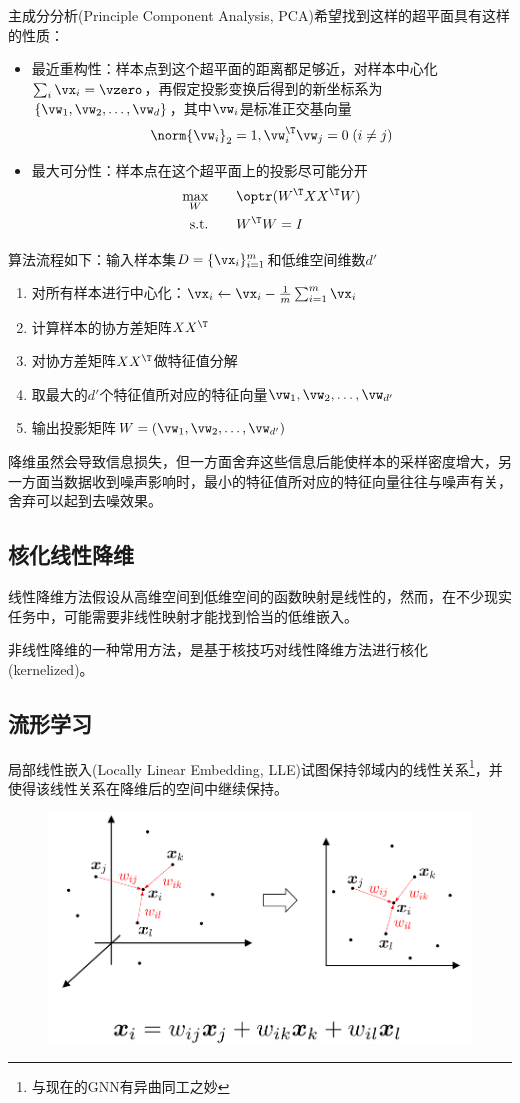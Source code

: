 主成分分析(Principle Component Analysis, PCA)希望找到这样的超平面具有这样的性质：
\begin{itemize}
	\item 最近重构性：样本点到这个超平面的距离都足够近，对样本中心化$\sum_i\vx_i=\vzero$，再假定投影变换后得到的新坐标系为$\{\vw_1,\vw_2,\ldots,\vw_d\}$，其中$\vw_i$是标准正交基向量
	\[\norm{\vw_i}_2=1,\vw_i^\T\vw_j=0\;(i\ne j)\]
	\item 最大可分性：样本点在这个超平面上的投影尽可能分开
	\[\begin{aligned}
	\max_{W} &\qquad \optr(W^\T XX^\T W)\\
	\text{s.t.} &\qquad W^\T W=I
	\end{aligned}\]
\end{itemize}

算法流程如下：输入样本集$D=\{\vx_i\}_{i=1}^m$和低维空间维数$d'$
\begin{enumerate}
	\item 对所有样本进行中心化：$\vx_i\gets \vx_i-\frac{1}{m}\sum_{i=1}^m\vx_i$
	\item 计算样本的协方差矩阵$XX^\T$
	\item 对协方差矩阵$XX^\T$做特征值分解
	\item 取最大的$d'$个特征值所对应的特征向量$\vw_1,\vw_2,\ldots,\vw_{d'}$
	\item 输出投影矩阵$W=(\vw_1,\vw_2,\ldots,\vw_{d'})$
\end{enumerate}

降维虽然会导致信息损失，但一方面舍弃这些信息后能使样本的采样密度增大，另一方面当数据收到噪声影响时，最小的特征值所对应的特征向量往往与噪声有关，舍弃可以起到去噪效果。

\subsection{核化线性降维}
线性降维方法假设从高维空间到低维空间的函数映射是线性的，然而，在不少现实任务中，可能需要非线性映射才能找到恰当的低维嵌入。

非线性降维的一种常用方法，是基于核技巧对线性降维方法进行核化(kernelized)。

\subsection{流形学习}
局部线性嵌入(Locally Linear Embedding, LLE)试图保持邻域内的线性关系\footnote{与现在的GNN有异曲同工之妙}，并使得该线性关系在降维后的空间中继续保持。
\begin{figure}[H]
\centering
\includegraphics[width=0.8\linewidth]{fig/LLE.png}
\end{figure}

